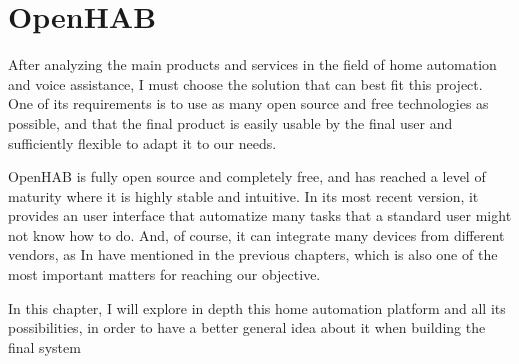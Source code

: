 \chapter{OpenHAB}

After analyzing the main products and services in the field of home automation and voice assistance, I must choose the solution
that can best fit this project. One of its requirements is to use as many open source and free technologies as possible, and that
the final product is easily usable by the final user and sufficiently flexible to adapt it to our needs.

OpenHAB is fully open source and completely free, and has reached a level of maturity where it is highly stable and intuitive. In its
most recent version, it provides an user interface that automatize many tasks that a standard user might not know how to do. And,
of course, it can integrate many devices from different vendors, as In have mentioned in the previous chapters, which is also one of
the most important matters for reaching our objective.

In this chapter, I will explore in depth this home automation platform and all its possibilities, in order to have a better general idea
about it when building the final system